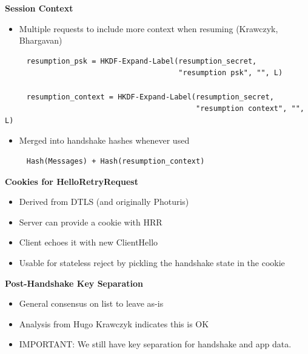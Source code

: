 \documentclass[helvetica]{seminar}
\newcommand{\heading}[1]{%
  \begin{center} 
    \large\bf 
    #1 
  \end{center} 
  \vspace{.4 in}}
\begin{document}
\begin{slide}
\heading{Session Context}

\begin{itemize}
\item Multiple requests to include more context when resuming (Krawczyk, Bhargavan)
\end{itemize}

{\footnotesize
\begin{verbatim}
     resumption_psk = HKDF-Expand-Label(resumption_secret,
                                        "resumption psk", "", L)

     resumption_context = HKDF-Expand-Label(resumption_secret,
                                            "resumption context", "", L)
\end{verbatim}
}

\begin{itemize}
\item Merged into handshake hashes whenever used
\end{itemize}

{\footnotesize
\begin{verbatim}
     Hash(Messages) + Hash(resumption_context)
\end{verbatim}
}
\end{slide}


\begin{slide}
\heading{Cookies for HelloRetryRequest}

\begin{itemize}
\item Derived from DTLS (and originally Photuris)
\item Server can provide a cookie with HRR 
\item Client echoes it with new ClientHello
\item Usable for stateless reject by pickling the handshake state in the cookie
\end{itemize}
\end{slide}


\begin{slide}
\heading{Post-Handshake Key Separation}

\begin{itemize}
\item General consensus on list to leave as-is
\item Analysis from Hugo Krawczyk indicates this is OK
\item IMPORTANT: We still have key separation for handshake and app data.
\end{itemize}
\end{slide}
\end{document}
